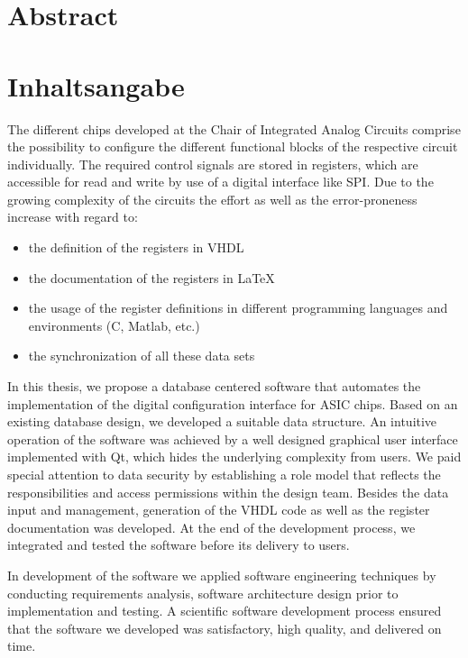 { \chapter{Abstract} 		}
{ \chapter{Inhaltsangabe}	}
The different chips developed at the Chair of Integrated Analog Circuits comprise the possibility to configure the different functional blocks of the respective circuit individually. The required control signals are stored in registers, which are accessible for read and write by use of a digital interface like SPI. Due to the growing complexity of the circuits the effort as well as the error-proneness increase with regard to:
\begin{itemize}[noitemsep]
\setlength\itemsep{0.1cm}
\item the definition of the registers in VHDL
\item the documentation of the registers in LaTeX
\item the usage of the register definitions in different programming languages and environments (C, Matlab, etc.)
\item the synchronization of all these data sets
\end{itemize}

In this thesis, we propose a database centered software that automates the implementation of the digital configuration interface for ASIC chips. Based on an existing database design, we developed a suitable data structure. An intuitive operation of the software was achieved by a well designed graphical user interface implemented with Qt, which hides the underlying complexity from users. We paid special attention to data security by establishing a role model that reflects the responsibilities and access permissions within the design team. Besides the data input and management, generation of the VHDL code as well as the register documentation was developed. At the end of the development process, we integrated and tested the software before its delivery to users.

In development of the software we applied software engineering techniques by conducting requirements analysis, software architecture design prior to implementation and testing. A scientific software development process ensured that the software we developed was satisfactory, high quality, and delivered on time. 